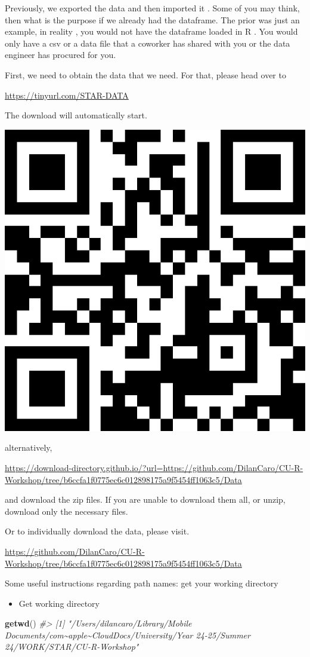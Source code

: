 \documentclass[
]{book}
\newenvironment{Shaded}{\begin{snugshade}}{\end{snugshade}}
\newcommand{\CommentTok}[1]{\textcolor[rgb]{0.56,0.35,0.01}{\textit{#1}}}
\newcommand{\FunctionTok}[1]{\textcolor[rgb]{0.13,0.29,0.53}{\textbf{#1}}}
\newcommand{\NormalTok}[1]{#1}
\providecommand{\tightlist}{%
  \setlength{\itemsep}{0pt}\setlength{\parskip}{0pt}}
\begin{document}
Previously, we exported the data and then imported it . Some of you may think, then what is the purpose if we already had the dataframe. The prior was just an example, in reality , you would not have the dataframe loaded in R . You would only have a csv or a data file that a coworker has shared with you or the data engineer has procured for you.

First, we need to obtain the data that we need. For that, please head over to

\url{https://tinyurl.com/STAR-DATA}

The download will automatically start.

\includegraphics[width=0.4\linewidth,height=0.2\textheight]{images/STAR-DATA}

alternatively,

\url{https://download-directory.github.io/?url=https://github.com/DilanCaro/CU-R-Workshop/tree/b6ccfa1f0775ec6c012898175a9f5454ff1063c5/Data}

and download the zip files. If you are unable to download them all, or unzip, download only the necessary files.

Or to individually download the data, please visit.

\url{https://github.com/DilanCaro/CU-R-Workshop/tree/b6ccfa1f0775ec6c012898175a9f5454ff1063c5/Data}

Some useful instructions regarding path names: get your working directory

\begin{itemize}
\tightlist
\item
  Get working directory
\end{itemize}

\begin{Shaded}
\begin{Highlighting}[]
\FunctionTok{getwd}\NormalTok{()}
\CommentTok{\#\textgreater{} [1] "/Users/dilancaro/Library/Mobile Documents/com\textasciitilde{}apple\textasciitilde{}CloudDocs/University/Year 24{-}25/Summer 24/WORK/STAR/CU{-}R{-}Workshop"}
\end{Highlighting}
\end{Shaded}
\end{document}
